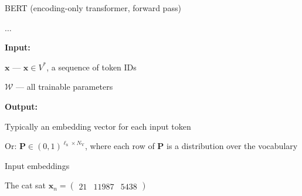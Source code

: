 \documentclass[12pt,aspectratio=169,handout]{beamer}
\begin{document}
\begin{frame}{BERT (encoding-only transformer, forward pass)}

\vspace{-1em}	
\begin{minipage}[t][3em][t]{15cm}
	\begin{algorithmic}[1]
		\State $\ldots$
		\EndFunction
	\end{algorithmic}
	
\end{minipage}
	
\textbf{Input:}

$\bm{x}$ --- $\bm{x} \in V^*$, a sequence of token IDs

$\bm{\mathcal{W}}$ --- all trainable parameters

\textbf{Output:}

Typically an embedding vector for each input token

Or: $\bm{P} \in (0,1)^{\ell_{\text{x}} \times N_{\text{V}}}$, where each row of $\bm{P}$ is a distribution over the vocabulary

\end{frame}




\begin{frame}{Input embeddings}
	
	The cat sat $\bm{x}_n =
	\begin{pmatrix}
		21 &
		11987 &
		5438
	\end{pmatrix}$
	

\end{frame}	
\end{document}
